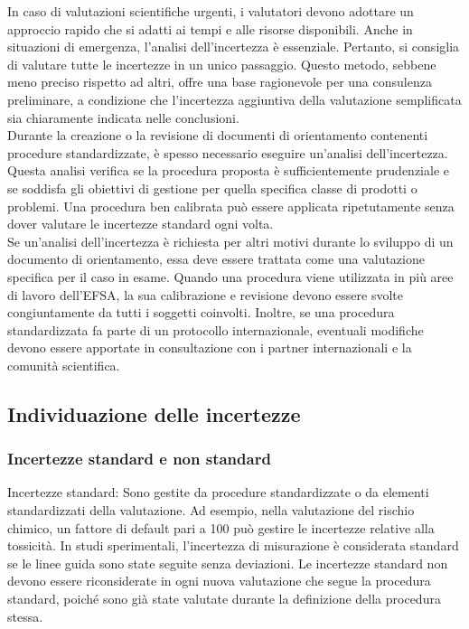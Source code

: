 In caso di valutazioni scientifiche urgenti, i valutatori devono adottare un approccio rapido che si adatti ai tempi e alle risorse disponibili. Anche in situazioni di emergenza, l'analisi dell'incertezza è essenziale. Pertanto, si consiglia di valutare tutte le incertezze in un unico passaggio. Questo metodo, sebbene meno preciso rispetto ad altri, offre una base ragionevole per una consulenza preliminare, a condizione che l'incertezza aggiuntiva della valutazione semplificata sia chiaramente indicata nelle conclusioni.\\

Durante la creazione o la revisione di documenti di orientamento contenenti procedure standardizzate, è spesso necessario eseguire un'analisi dell'incertezza. Questa analisi verifica se la procedura proposta è sufficientemente prudenziale e se soddisfa gli obiettivi di gestione per quella specifica classe di prodotti o problemi. Una procedura ben calibrata può essere applicata ripetutamente senza dover valutare le incertezze standard ogni volta.\\

Se un'analisi dell'incertezza è richiesta per altri motivi durante lo sviluppo di un documento di orientamento, essa deve essere trattata come una valutazione specifica per il caso in esame. Quando una procedura viene utilizzata in più aree di lavoro dell'EFSA, la sua calibrazione e revisione devono essere svolte congiuntamente da tutti i soggetti coinvolti. Inoltre, se una procedura standardizzata fa parte di un protocollo internazionale, eventuali modifiche devono essere apportate in consultazione con i partner internazionali e la comunità scientifica.\\

\subsection{Individuazione delle incertezze}

\subsubsection{Incertezze standard e non standard}

Incertezze standard: Sono gestite da procedure standardizzate o da elementi standardizzati della valutazione. Ad esempio, nella valutazione del rischio chimico, un fattore di default pari a 100 può gestire le incertezze relative alla tossicità. In studi sperimentali, l'incertezza di misurazione è considerata standard se le linee guida sono state seguite senza deviazioni. Le incertezze standard non devono essere riconsiderate in ogni nuova valutazione che segue la procedura standard, poiché sono già state valutate durante la definizione della procedura stessa.\\

